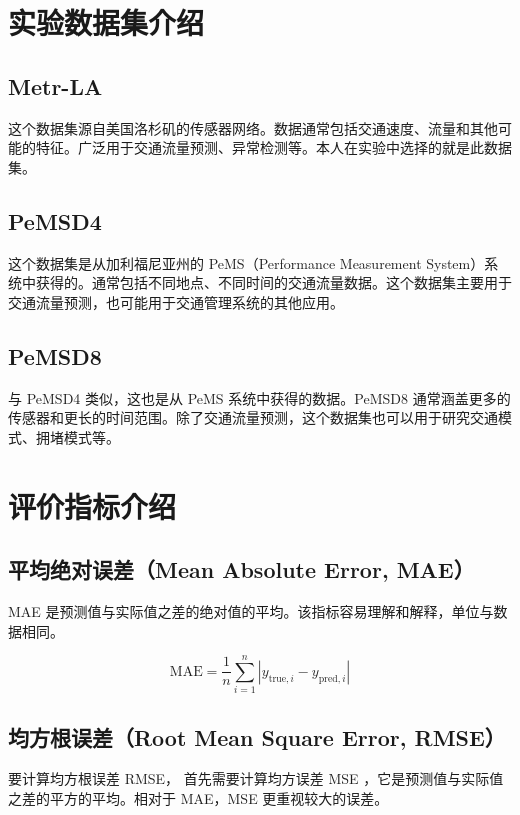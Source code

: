 \documentclass[4pt]{article}
\begin{document}
\section{实验数据集介绍}


\subsection{Metr-LA}

这个数据集源自美国洛杉矶的传感器网络。数据通常包括交通速度、流量和其他可能的特征。广泛用于交通流量预测、异常检测等。本人在实验中选择的就是此数据集。

\subsection{PeMSD4}

这个数据集是从加利福尼亚州的 PeMS（Performance Measurement System）系统中获得的。通常包括不同地点、不同时间的交通流量数据。这个数据集主要用于交通流量预测，也可能用于交通管理系统的其他应用。

\subsection{PeMSD8}

与 PeMSD4 类似，这也是从 PeMS 系统中获得的数据。PeMSD8 通常涵盖更多的传感器和更长的时间范围。除了交通流量预测，这个数据集也可以用于研究交通模式、拥堵模式等。

\section{评价指标介绍}

\subsection{平均绝对误差（Mean Absolute Error, MAE）}

MAE 是预测值与实际值之差的绝对值的平均。该指标容易理解和解释，单位与数据相同。

\[
\text{MAE} = \frac{1}{n} \sum_{i=1}^{n} \left| y_{\text{true}, i} - y_{\text{pred}, i} \right|
\]

\subsection{均方根误差（Root Mean Square Error, RMSE）}

要计算均方根误差 RMSE， 首先需要计算均方误差 MSE ，它是预测值与实际值之差的平方的平均。相对于 MAE，MSE 更重视较大的误差。
\end{document}
